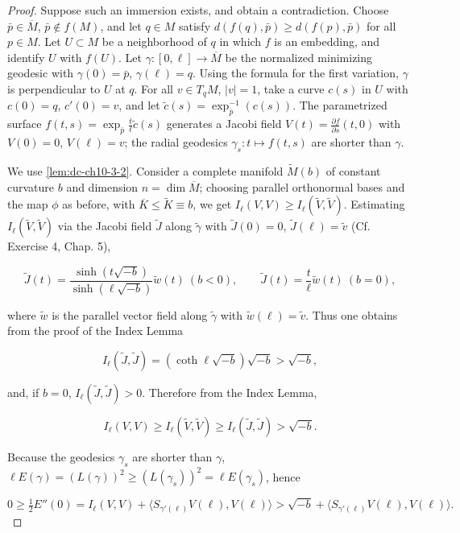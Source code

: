 \begin{proof}
  Suppose such an immersion exists, and obtain a contradiction. Choose
  $\bar p\in\overline{M}$, $\bar p\notin f(M)$, and let $q\in M$ satisfy
  $d(f(q),\bar p)\geq d(f(p),\bar p)$ for all $p\in M$. Let $U\subset M$ be a
  neighborhood of $q$ in which $f$ is an embedding, and identify $U$ with $f(U)$.
  Let $\gamma:[0,\ell]\to\overline{M}$ be the normalized minimizing geodesic with
  $\gamma(0)=\bar p$, $\gamma(\ell)=q$. Using the formula for the first variation,
  $\gamma$ is perpendicular to $U$ at $q$. For all $v\in T_qM$, $|v|=1$, take a
  curve $c(s)$ in $U$ with $c(0)=q$, $c'(0)=v$, and let $\tilde c(s)=\exp_{\bar p}^{-1}(c(s))$.
  The parametrized surface $f(t,s)=\exp_{\bar p}\frac{t}{\ell}\tilde c(s)$ generates
  a Jacobi field $V(t)=\frac{\partial f}{\partial s}(t,0)$ with $V(0)=0$, $V(\ell)=v$;
  the radial geodesics $\gamma_s:t\mapsto f(t,s)$ are shorter than $\gamma$.
  
  We use \cref{lem:dc-ch10-3-2}. Consider a complete manifold $\widetilde{M}(b)$ of constant
  curvature $b$ and dimension $n=\dim\overline{M}$; choosing parallel orthonormal
  bases and the map $\phi$ as before, with $\overline{K}\leq\widetilde{K}\equiv b$,
  we get $I_\ell(V,V)\geq I_\ell(\tilde V,\tilde V)$. Estimating $I_\ell(\tilde V,\tilde V)$
  via the Jacobi field $\tilde J$ along $\tilde\gamma$ with $\tilde J(0)=0$,
  $\tilde J(\ell)=\tilde v$ (Cf. Exercise 4, Chap. 5),
  
  $$
  \tilde J(t)=\frac{\sinh(t\sqrt{-b})}{\sinh(\ell\sqrt{-b})}\tilde w(t)\ (b<0),\qquad\tilde J(t)=\frac{t}{\ell}\tilde w(t)\ (b=0),
  $$
  
  where $\tilde w$ is the parallel vector field along $\tilde\gamma$ with
  $\tilde w(\ell)=\tilde v$. Thus
  one obtains from the proof of the Index Lemma
  
  $$
  I_\ell(\tilde J,\tilde J)=(\coth\ell\sqrt{-b})\sqrt{-b}>\sqrt{-b},
  $$
  
  and, if $b=0$, $I_\ell(\tilde J,\tilde J)>0$. Therefore from the Index Lemma,
  
  $$
  I_\ell(V,V)\geq I_\ell(\tilde V,\tilde V)\geq I_\ell(\tilde J,\tilde J)>\sqrt{-b}.
  $$
  
  Because the geodesics $\gamma_s$ are shorter than $\gamma$,
  $\ell E(\gamma)=(L(\gamma))^2\geq(L(\gamma_s))^2=\ell E(\gamma_s)$, hence
  
  $$
  0\geq\tfrac{1}{2}E''(0)=I_\ell(V,V)+\langle S_{\gamma'(\ell)}V(\ell),V(\ell)\rangle>\sqrt{-b}+\langle S_{\gamma'(\ell)}V(\ell),V(\ell)\rangle.
  $$
  

\end{proof}
